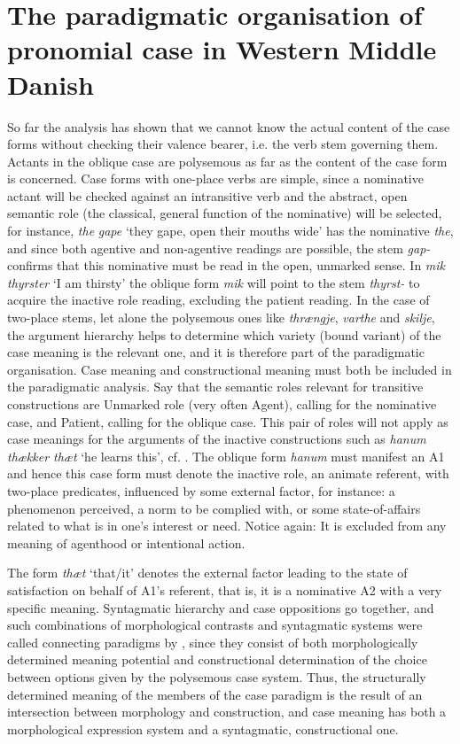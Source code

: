 \documentclass[output=paper]{langscibook}
\begin{document}
\section{The paradigmatic organisation of pronomial case in Western Middle Danish} \label{heltoft:3}\largerpage

So far the analysis has shown that we cannot know the actual content of the case forms without checking their valence bearer, i.e. the verb stem governing them. Actants in the oblique case are polysemous as far as the content of the case form is concerned. Case forms with one-place verbs are simple, since a nominative actant will be checked against an intransitive verb and the abstract, open semantic role (the classical, general function of the nominative) will be selected, for instance, \textit{the} \textit{gape} ‘they gape, open their mouths wide' has the nominative \textit{the}, and since both agentive and non-agentive readings are possible, the stem \textit{gap-} confirms that this nominative must be read in the open, unmarked sense. In \textit{mik thyrster} ‘I am thirsty' the oblique form \textit{mik} will point to the stem \textit{thyrst-} to acquire the inactive role reading, excluding the patient reading. In the case of two-place stems, let alone the polysemous ones like \textit{thrængje}, \textit{varthe} and \textit{skilje}, the argument hierarchy helps to determine which variety (bound variant) of the case meaning is the relevant one, and it is therefore part of the paradigmatic organisation. Case meaning and constructional meaning must both be included in the paradigmatic analysis. Say that the semantic roles relevant for transitive constructions are Unmarked role (very often Agent), calling for the nominative case, and Patient, calling for the oblique case. This pair of roles will not apply as case meanings for the arguments of the inactive constructions such as \textit{hanum thækker thæt} ‘he learns this', cf. . The oblique form \textit{hanum} must manifest an A1 and hence this case form must denote the inactive role, an animate referent, with two-place predicates, influenced by some external factor, for instance: a phenomenon perceived, a norm to be complied with, or some state-of-affairs related to what is in one's interest or need. Notice again: It is excluded from any meaning of agenthood or intentional action. 

The form \textit{thæt} ‘that/it' denotes the external factor leading to the state of satisfaction on behalf of A1's referent, that is, it is a nominative A2 with a very specific meaning. Syntagmatic hierarchy and case oppositions go together, and such combinations of morphological contrasts and syntagmatic systems were called connecting paradigms by \citet{Nørgård-Sørensen2011}, since they consist of both morphologically determined meaning potential and constructional determination of the choice between options given by the polysemous case system. Thus, the structurally determined meaning of the members of the case paradigm is the result of an intersection between morphology and construction, and case meaning has both a morphological expression system and a syntagmatic, constructional one.
\end{document}

